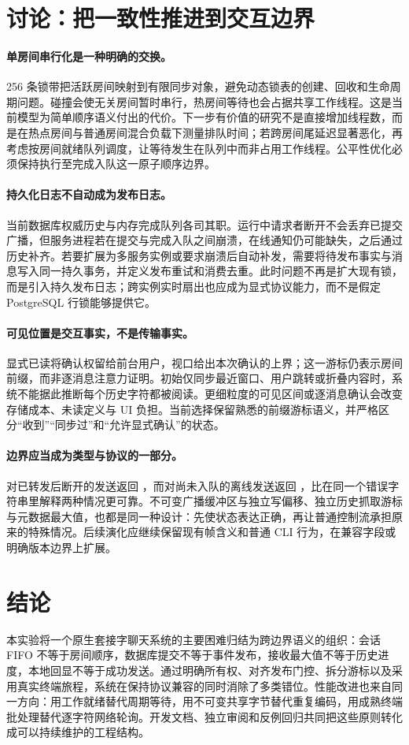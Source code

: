 \section{讨论：把一致性推进到交互边界}
\label{sec:discussion}
\paragraph{单房间串行化是一种明确的交换。}
256 条锁带把活跃房间映射到有限同步对象，避免动态锁表的创建、回收和生命周期问题。碰撞会使无关房间暂时串行，热房间等待也会占据共享工作线程。这是当前模型为简单顺序语义付出的代价。下一步有价值的研究不是直接增加线程数，而是在热点房间与普通房间混合负载下测量排队时间；若跨房间尾延迟显著恶化，再考虑按房间就绪队列调度，让等待发生在队列中而非占用工作线程。公平性优化必须保持执行至完成入队这一原子顺序边界。

\paragraph{持久化日志不自动成为发布日志。}
当前数据库权威历史与内存完成队列各司其职。运行中请求者断开不会丢弃已提交广播，但服务进程若在提交与完成入队之间崩溃，在线通知仍可能缺失，之后通过历史补齐。若要扩展为多服务实例或要求崩溃后自动补发，需要将待发布事实与消息写入同一持久事务，并定义发布重试和消费去重。此时问题不再是扩大现有锁，而是引入持久发布日志；跨实例实时扇出也应成为显式协议能力，而不是假定 PostgreSQL 行锁能够提供它。

\paragraph{可见位置是交互事实，不是传输事实。}
显式已读将确认权留给前台用户，视口给出本次确认的上界；这一游标仍表示房间前缀，而非逐消息注意力证明。初始仅同步最近窗口、用户跳转或折叠内容时，系统不能据此推断每个历史字符都被阅读。更细粒度的可见区间或逐消息确认会改变存储成本、未读定义与 UI 负担。当前选择保留熟悉的前缀游标语义，并严格区分“收到”“同步过”和“允许显式确认”的状态。

\paragraph{边界应当成为类型与协议的一部分。}
对已转发后断开的发送返回 ，而对尚未入队的离线发送返回 ，比在同一个错误字符串里解释两种情况更可靠。不可变广播缓冲区与独立写偏移、独立历史抓取游标与元数据最大值，也都是同一种设计：先使状态表达正确，再让普通控制流承担原来的特殊情况。后续演化应继续保留现有帧含义和普通 CLI 行为，在兼容字段或明确版本边界上扩展。

\section{结论}
本实验将一个原生套接字聊天系统的主要困难归结为跨边界语义的组织：会话 FIFO 不等于房间顺序，数据库提交不等于事件发布，接收最大值不等于历史进度，本地回显不等于成功发送。通过明确所有权、对齐发布门控、拆分游标以及采用真实终端旅程，系统在保持协议兼容的同时消除了多类错位。性能改进也来自同一方向：用工作就绪替代周期等待，用不可变共享字节替代重复编码，用成熟终端批处理替代逐字符网络轮询。开发文档、独立审阅和反例回归共同把这些原则转化成可以持续维护的工程结构。
